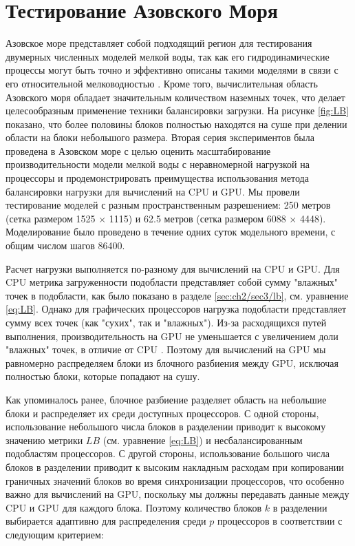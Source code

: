 \section{Тестирование Азовского Моря}\label{sec:ch3/sec1}

Азовское море представляет собой подходящий регион для тестирования двумерных численных моделей мелкой воды, так как его гидродинамические процессы могут быть точно и эффективно описаны такими моделями в связи с его относительной мелководностью \cite{Azov}.
Кроме того, вычислительная область Азовского моря обладает значительным количеством наземных точек, что делает целесообразным применение техники балансировки загрузки.
На рисунке \ref{fig:LB} показано, что более половины блоков полностью находятся на суше при делении области на блоки небольшого размера.
Вторая серия экспериментов была проведена в Азовском море с целью оценить масштабирование производительности модели мелкой воды с неравномерной нагрузкой на процессоры и продемонстрировать преимущества использования метода балансировки нагрузки для вычислений на CPU и GPU.
Мы провели тестирование моделей с разным пространственным разрешением: 250 метров (сетка размером 1525 $\times$ 1115) и 62.5 метров (сетка размером 6088 $\times$ 4448). Моделирование было проведено в течение одних суток модельного времени, с общим числом шагов 86400.  


Расчет нагрузки выполняется по-разному для вычислений на CPU и GPU.
Для CPU метрика загруженности подобласти представляет собой сумму "влажных" точек в подобласти, как было показано в разделе \ref{sec:ch2/sec3/lb}, см. уравнение \ref{eq:LB}.
Однако для графических процессоров нагрузка подобласти представляет сумму всех точек (как "сухих", так и "влажных").
Из-за расходящихся путей выполнения, производительность на GPU не уменьшается с увеличением доли "влажных" точек, в отличие от CPU \cite{kirk10}.
Поэтому для вычислений на GPU мы равномерно распределяем блоки из блочного разбиения между GPU, исключая полностью блоки, которые попадают на сушу.

Как упоминалось ранее, блочное разбиение разделяет область на небольшие блоки и распределяет их среди доступных процессоров.
С одной стороны, использование небольшого числа блоков в разделении приводит к высокому значению метрики $LB$ (см. уравнение \ref{eq:LB}) и несбалансированным подобластям процессоров.
С другой стороны, использование большого числа блоков в разделении приводит к высоким накладным расходам при копировании граничных значений блоков во время синхронизации процессоров, что особенно важно для вычислений на GPU, поскольку мы должны передавать данные между CPU и GPU для каждого блока.
Поэтому количество блоков $k$ в разделении выбирается адаптивно для распределения среди $p$ процессоров в соответствии с следующим критерием:

